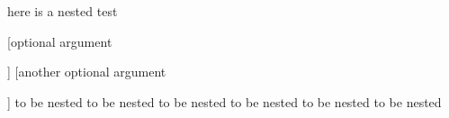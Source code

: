 here is a nested test
\begin{one}

	[optional argument

	]
	[another optional argument

	]
	to be nested to be nested
	to be nested to be nested
	to be nested to be nested
\end{one}
